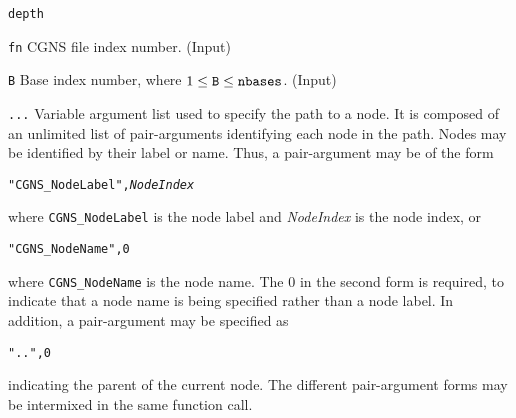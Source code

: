 \begin{Ventryi}{\texttt{depth}}\raggedright
\item [\texttt{fn}]
      CGNS file index number.
      (\textcolor{input}{Input})
\item [\texttt{B}]
      Base index number, where $1 \leq \text{\texttt{B}} \leq \text{\texttt{nbases}}$.
      (\textcolor{input}{Input})
\item [\texttt{...}]
      Variable argument list used to specify the path to a node.
      It is composed of an unlimited list of pair-arguments
      identifying each node in the path.
      Nodes may be identified by their label or name.
      Thus, a pair-argument may be of the form
\begin{alltt}
   "CGNS\_NodeLabel", \textit{NodeIndex}
\end{alltt}
      where \texttt{CGNS\_NodeLabel} is the node label and
      \textit{NodeIndex} is the node index, or
\begin{alltt}
   "CGNS\_NodeName", 0
\end{alltt}
      where \texttt{CGNS\_NodeName} is the node name.
      The 0 in the second form is required, to indicate that a node
      name is being specified rather than a node label.
      In addition, a pair-argument may be specified as
\begin{alltt}
   "..", 0
\end{alltt}
      indicating the parent of the current node.
      The different pair-argument forms may be intermixed in the same
      function call.


\end{Ventryi}
